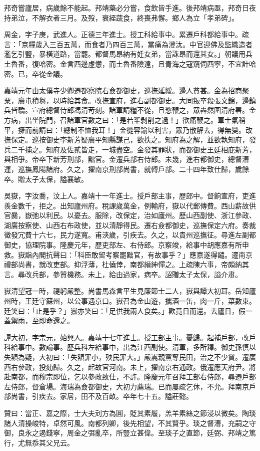 \begin{pinyinscope}
邦奇嘗廬居，病歲餘不能起。邦靖藥必分嘗，食飲皆手進。後邦靖病亟，邦奇日夜持弟泣，不解衣者三月。及歿，衰絰蔬食，終喪弗懈。鄉人為立「孝弟碑」。

周金，字子庚，武進人。正德三年進士。授工科給事中。累遷戶科都給事中。疏言：「京糧歲入三百五萬，而食者乃四百三萬，當痛為澄汰。中官迎佛及監織造者濫乞引鹽，暴橫道路，當罷。都督馬昂納有妊女弟，當誅昂而還其女。」朝議用兵土魯番，復哈密。金言西邊虛憊，而土魯番險遠，且青海之寇窺伺西寧，不宜計哈密。已，卒從金議。

嘉靖元年由太僕寺少卿遷都察院右僉都御史，巡撫延綏。邊人貧甚。金為招商聚粟，廣屯積芻，以時給其食。改撫宣府，進右副都御史。大同叛卒殺張文錦，邊鎮兵皆驕。宣府總督侍郎馮清苛刻。諸軍請糧不從，且慾鞭之，眾轟然圍清府署。金方病，出坐院門，召諸軍官數之曰：「是若輩剝削之過！」欲痛鞭之。軍士氣稍平，擁而前請曰：「總制不恤我耳！」金從容諭以利害，眾乃散解去，得無變。改撫保定。巡按御史李新芳疑廣平知縣謀己，欲抶之。知府為之解，並欲執知府，發兵二千捕之。知府及佐貳皆走，一城盡空。金發其罪狀，而都御史王廷相庇新芳，與相爭。帝卒下新芳刑部，黜官。金遷兵部右侍郎。未幾，進右都御史，總督漕運，巡撫鳳陽諸府。久之，擢南京刑部尚書，就轉戶部。二十四年致仕歸，歲餘卒。贈太子太保，謚襄敏。

吳嶽，字汝喬，汶上人。嘉靖十一年進士。授戶部主事，歷郎中。督餉宣府，吏進羨金數千，拒之。出知廬州府。稅課歲萬金，例輸府，嶽以代郵傳費。西山薪故供官爨，嶽弛以利民。以憂去。服除，改保定，治如廬州。歷山西副使、浙江參政、湖廣按察使、山西右布政使，並以清靜得民。遷右僉都御史，巡撫保定六府。奏裁徵發冗費十六七，民力遂寬。甫浹歲，引疾去。久之，以貴州巡撫征。尋進左副都御史，協理院事。隆慶元年，歷吏部左、右侍郎。京察竣，給事中胡應嘉有所申救。嶽詣內閣抗聲曰：「科臣敢留考察罷黜官，有故事乎？」應嘉遂得譴。遷南京禮部尚書，就改吏部。抑浮薄，杜僥倖，南都縉紳憚之。上疏陳六事，帝頗納其言。尋改兵部，參贊機務。未上，給由過家，病卒。詔贈太子太保，謚介肅。

嶽清望冠一時，禔躬嚴整。尚書馬森言平生見廉節士二人，嶽與譚大初耳。岳知廬州時，王廷守蘇州，以公事遇京口。嶽召為金山遊，攜酒一缶，肉一斤，菜數束。廷笑曰：「止是乎？」嶽亦笑曰：「足供我兩人食矣。」歡竟日而還。去廬日，假一蓋禦雨，至即命還之。

譚大初，字宗元，始興人。嘉靖十七年進士。授工部主事。憂歸。起補戶部，改戶科給事中。數論事。歷兵科左給事中，出為江西副使。清軍，多所釋。御史孫慎以失額為疑，大初曰：「失額罪小，殃民罪大。」嚴嵩親黨奪民田，治之不少貸。遷廣西右參政，投劾歸。久之，起故官河南。未上，擢南京右通政。俄遷應天府尹。將赴南都，而穆宗即位，乞以參政致仕，不許。隆慶元年召拜工部右侍郎，尋遷戶部左侍郎，督倉場。海瑞為僉都御史，大初力薦瑞。已而屢疏乞休，不允。拜南京戶部尚書，引疾去。家居，田不及百畝。卒年七十五。謚莊懿。

贊曰：當正、嘉之際，士大夫刓方為圓，貶其素履，羔羊素絲之節浸以微矣。陶琰諸人清操峻特，卓然可風。南都列卿，後先相望，不其賢乎。琰之督漕，充嗣之守御，良永之遏錢寧，周金之弭亂卒，所豎立甚偉。至琰子之直節，廷弼、邦靖之篤行，尤無忝其父兄云。


\end{pinyinscope}
